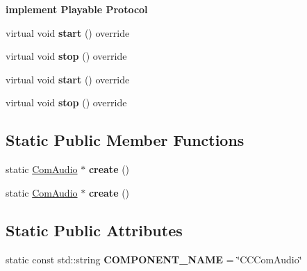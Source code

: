 \begin{Indent}\textbf{ implement Playable Protocol}\par
\begin{DoxyCompactItemize}
\item 
\mbox{\label{classcocostudio_1_1ComAudio_a85f3f43b968d139dc98ee50f1d5d5b0d}} 
virtual void {\bfseries start} () override
\item 
\mbox{\label{classcocostudio_1_1ComAudio_a7d3a9455d74fc84bd38827aebf5bd9a3}} 
virtual void {\bfseries stop} () override
\item 
\mbox{\label{classcocostudio_1_1ComAudio_a398a583c08c8b7533be05b09f4e374db}} 
virtual void {\bfseries start} () override
\item 
\mbox{\label{classcocostudio_1_1ComAudio_a0d5cf436f8c4a3d3173a064963a43067}} 
virtual void {\bfseries stop} () override
\end{DoxyCompactItemize}
\end{Indent}
\subsection*{Static Public Member Functions}
\begin{DoxyCompactItemize}
\item 
\mbox{\label{classcocostudio_1_1ComAudio_a54ba41b483b55d6fded54910b031783a}} 
static \hyperlink{classcocostudio_1_1ComAudio}{Com\+Audio} $\ast$ {\bfseries create} ()
\item 
\mbox{\label{classcocostudio_1_1ComAudio_ab7b9bb244b110e98e116c9370420ce76}} 
static \hyperlink{classcocostudio_1_1ComAudio}{Com\+Audio} $\ast$ {\bfseries create} ()
\end{DoxyCompactItemize}
\subsection*{Static Public Attributes}
\begin{DoxyCompactItemize}
\item 
\mbox{\label{classcocostudio_1_1ComAudio_ae6e98df87973776775d7d33fdf510601}} 
static const std\+::string {\bfseries C\+O\+M\+P\+O\+N\+E\+N\+T\+\_\+\+N\+A\+ME} = \char`\"{}C\+C\+Com\+Audio\char`\"{}
\end{DoxyCompactItemize}


